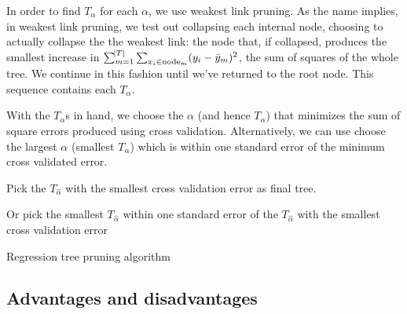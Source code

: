\documentclass[12pt]{article}
\begin{document}
In order to find $T_{\alpha}$ for each $\alpha$, we use weakest link pruning. As the name implies, in weakest link pruning, we test out collapsing each internal node, choosing to actually collapse the the weakest link: the node that, if collapsed, produces the smallest increase in $\sum_{m = 1}^{\abs{T}} \sum_{x_{i} \in \text{node}_{m}} (y_{i} - \bar{y}_{m})^2$, the sum of squares of the whole tree. We continue in this fashion until we've returned to the root node. This sequence contains each $T_{\alpha}$. 

With the $T_{\alpha}$s in hand, we choose the $\alpha$ (and hence $T_{\alpha}$) that minimizes the sum of square errors produced using cross validation. Alternatively, we can use choose the largest $\alpha$ (smallest $T_{\alpha}$) which is within one standard error of the minimum cross validated error.

\begin{algorithm}[h]
Pick the $T_{\hat{\alpha}}$ with the smallest cross validation error as final tree. 

Or pick the smallest $T_{\hat{\alpha}}$ within one standard error of the $T_{\hat{\alpha}}$ with the smallest cross validation error
 \caption{Regression tree pruning algorithm}
\end{algorithm}



%
%


\subsection{Advantages and disadvantages} %
\label{sub:advantages_and_disadvantages_to_cart}
\end{document}
